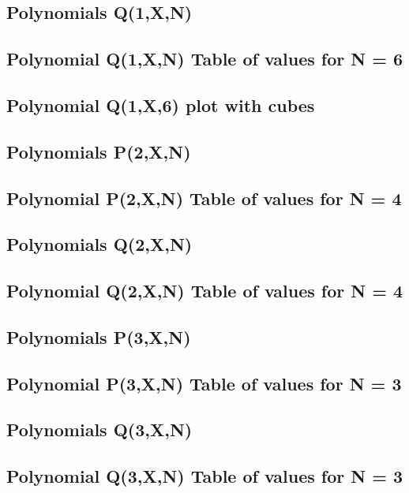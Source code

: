 \documentclass[12pt,letterpaper,oneside,reqno]{amsart}
\begin{document}
    \subsection{Polynomials Q(1,X,N)}
    

    \subsection{Polynomial Q(1,X,N) Table of values for N = 6}
    

    \subsection{Polynomial Q(1,X,6) plot with cubes}
    

    \subsection{Polynomials P(2,X,N)}
    

    \subsection{Polynomial P(2,X,N) Table of values for N = 4}
    

    \subsection{Polynomials Q(2,X,N)}
    

    \subsection{Polynomial Q(2,X,N) Table of values for N = 4}
    

    \subsection{Polynomials P(3,X,N)}
    

    \subsection{Polynomial P(3,X,N) Table of values for N = 3}
    

    \subsection{Polynomials Q(3,X,N)}
    

    \subsection{Polynomial Q(3,X,N) Table of values for N = 3}
    


%    
%    
\end{document}
